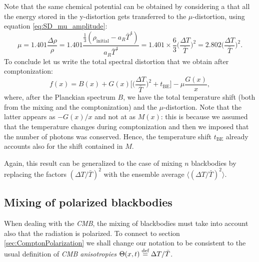 Note that the same chemical potential can be obtained by considering a that all the energy stored in the y-distortion gets transferred to the $\mu$-distortion, using equation \ref{eq:SD_mu_amplitude}:$$\mu=1.401\frac{\Delta \rho}{\rho}=1.401\frac{\frac{1}{3}(\rho_\text{initial}-a_R \bar T^4)}{a_R \bar T^4}=1.401\times\frac{6}{3}\bigg(\frac{\Delta T}{\bar T}\bigg)^2=2.802\bigg(\frac{\Delta T}{\bar T}\bigg)^2.$$
To conclude let us write the total spectral distortion that we obtain after comptonization:
$$f(x)=B(x)+G(x)\bigg[\bigg(\frac{\Delta T}{\bar T}\bigg)^2+t_\text{BE}\bigg]-\mu\frac{G(x)}{x},$$
where, after the Planckian spectrum $B$, we have the total temperature shift (both from the mixing and the comptonization) and the $\mu$-distortion. Note that the latter appears as $-G(x)/x$ and not at as $M(x)$: this is because we assumed that the temperature changes during comptonization and then we imposed that the number of photons was conserved. Hence, the temperature shift $t_\text{BE}$ already accounts also for the shift contained in $M$.

Again, this result can be generalized to the case of mixing $n$ blackbodies by replacing the factors $(\Delta T /\bar T)^2$ with the ensemble average $\langle(\Delta T /\bar T)^2\rangle$.

\subsection{Mixing of polarized blackbodies}
\label{sec:MixingPolarization}
When dealing with the \emph{CMB}, the mixing of blackbodies must take into account also that the radiation is polarized. To connect to section \ref{sec:ComptonPolarization} we shall change our notation to be consistent to the usual definition of \emph{CMB anisotropies} $\Theta(x,t)\stackrel{\text{def}}{=} \Delta T/\bar T$.


